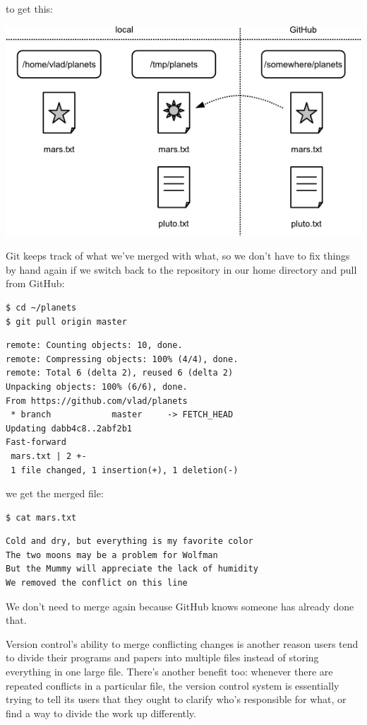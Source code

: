 \documentclass[]{book}
\begin{document}
to get this:

\includegraphics{novice/git/img/git-after-merging.png}

Git keeps track of what we've merged with what, so we don't have to fix
things by hand again if we switch back to the repository in our home
directory and pull from GitHub:

\begin{verbatim}
$ cd ~/planets
$ git pull origin master
\end{verbatim}

\begin{verbatim}
remote: Counting objects: 10, done.
remote: Compressing objects: 100% (4/4), done.
remote: Total 6 (delta 2), reused 6 (delta 2)
Unpacking objects: 100% (6/6), done.
From https://github.com/vlad/planets
 * branch            master     -> FETCH_HEAD
Updating dabb4c8..2abf2b1
Fast-forward
 mars.txt | 2 +-
 1 file changed, 1 insertion(+), 1 deletion(-)
\end{verbatim}

we get the merged file:

\begin{verbatim}
$ cat mars.txt
\end{verbatim}

\begin{verbatim}
Cold and dry, but everything is my favorite color
The two moons may be a problem for Wolfman
But the Mummy will appreciate the lack of humidity
We removed the conflict on this line
\end{verbatim}

We don't need to merge again because GitHub knows someone has already
done that.

Version control's ability to merge conflicting changes is another reason
users tend to divide their programs and papers into multiple files
instead of storing everything in one large file. There's another benefit
too: whenever there are repeated conflicts in a particular file, the
version control system is essentially trying to tell its users that they
ought to clarify who's responsible for what, or find a way to divide the
work up differently.
\end{document}
